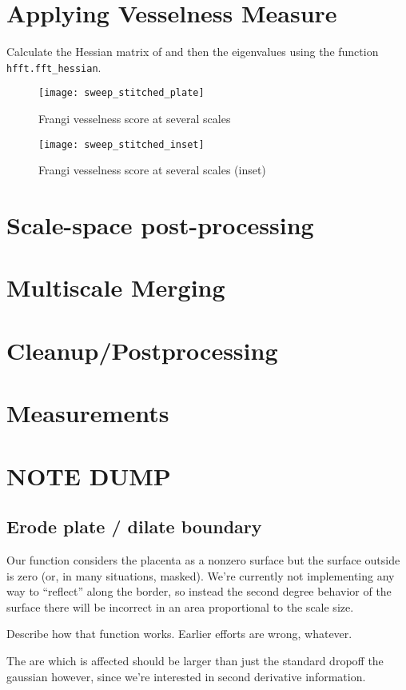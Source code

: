 \section{Applying Vesselness Measure}
Calculate the Hessian matrix of  and then the eigenvalues using the function \texttt{hfft.fft\_hessian}.


\begin{figure}
	\texttt{[image: sweep\_stitched\_plate]}
	\caption{Frangi vesselness score at several scales}
\end{figure}
\begin{figure}
	\texttt{[image: sweep\_stitched\_inset]}
	\caption{Frangi vesselness score at several scales (inset)}
\end{figure}
\section{Scale-space post-processing}
\section{Multiscale Merging}
\section{Cleanup/Postprocessing}
\section{Measurements}

\section{NOTE DUMP}
	
	\subsection{Erode plate / dilate boundary}
	
	Our function considers the placenta as a nonzero surface but the surface outside is zero (or, in many situations, masked). We're currently not implementing any way to ``reflect'' along the border, so instead the second degree behavior of the surface there will be incorrect in an area proportional to the scale size.
	
	Describe how that function works. Earlier efforts are wrong, whatever.
	
	The are which is affected should be larger than just the standard dropoff the gaussian however, since we're interested
	in second derivative information.
